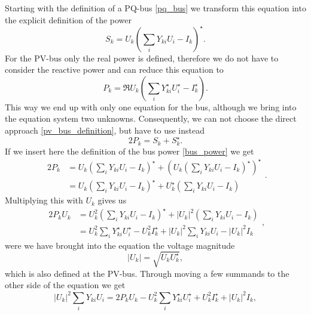 Starting with the definition of a PQ-bus \eqref{pq_bus} we transform this equation into the explicit definition of the power
\begin{equation}
	S_k = U_k \left( \sum_i Y_{ki} U_i - I_k \right)^\star.
	\label{eq:bus_power}
\end{equation}
For the PV-bus only the real power is defined, therefore we do not have to consider the reactive power and can reduce this equation to
\begin{equation}
	P_k = \Re{U_k \left( \sum_i Y_{ki}^\star U_i^\star - I_k^\star \right)}.
	\label{eq:pv_bus_definition}
\end{equation}
This way we end up with only one equation for the bus, although we bring into the equation system two unknowns. Consequently, we can not choose the direct approach \eqref{pv_bus_definition}, but have to use instead
\begin{equation}
	2 P_k = S_k + S_k^\star.
\end{equation}
If we insert here the definition of the bus power \eqref{bus_power} we get
\begin{equation}
	\begin{split}
		2 P_k 	& = U_k \left( \sum_i Y_{ki} U_i - I_k \right)^\star + \left( U_k \left( \sum_i Y_{ki} U_i - I_k \right)^\star \right)^\star \\
				& = U_k \left( \sum_i Y_{ki} U_i - I_k \right)^\star + U_k^\star \left( \sum_i Y_{ki} U_i - I_k \right)
	\end{split}.
\end{equation}
Multiplying this with $U_k$ gives us
\begin{equation}
	\begin{split}
		2 P_k U_k 	& = U_k^2 \left( \sum_i Y_{ki} U_i - I_k \right)^\star + |U_k|^2 \left( \sum_i Y_{ki} U_i - I_k \right) \\
					& = U_k^2 \sum_i Y_{ki}^\star U_i^\star - U_k^2 I_k^\star + |U_k|^2 \sum_i Y_{ki} U_i - |U_k|^2 I_k
	\end{split},
\end{equation}
were we have brought into the equation the voltage magnitude 
\begin{equation}
	|U_k| = \sqrt{U_k U_k^\star},
\end{equation}
which is also defined at the PV-bus. Through moving a few summands to the other side of the equation we get
\begin{equation}
	|U_k|^2 \sum_i Y_{ki} U_i = 2 P_k U_k - U_k^2 \sum_i Y_{ki}^\star U_i^\star + U_k^2 I_k^\star + |U_k|^2 I_k,
\end{equation}
